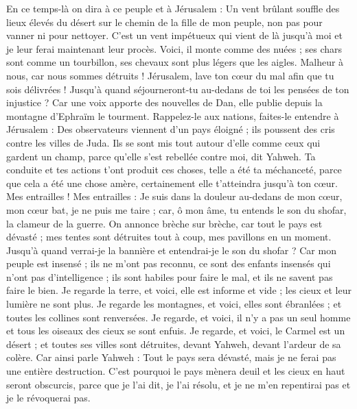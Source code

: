 \begin{multicols}{2}
En ce temps-là on dira à ce peuple et à Jérusalem : Un vent brûlant souffle des lieux élevés du désert sur le chemin de la fille de mon peuple, non pas pour vanner ni pour nettoyer.
C'est un vent impétueux qui vient de là jusqu'à moi et je leur ferai maintenant leur procès. 
Voici, il monte comme des nuées ; ses chars sont comme un tourbillon, ses chevaux sont plus légers que les aigles. Malheur à nous, car nous sommes détruits !
Jérusalem, lave ton cœur du mal afin que tu sois délivrées ! Jusqu'à quand séjourneront-tu au-dedans de toi les pensées de ton injustice ?
Car une voix apporte des nouvelles de Dan, elle publie depuis la montagne d'Ephraïm le tourment.
Rappelez-le aux nations, faites-le entendre à Jérusalem : Des observateurs viennent d'un pays éloigné ; ils poussent des cris contre les villes de Juda.
Ils se sont mis tout autour d'elle comme ceux qui gardent un champ, parce qu'elle s'est rebellée contre moi, dit Yahweh.
Ta conduite et tes actions t'ont produit ces choses, telle a été ta méchanceté, parce que cela a été une chose amère, certainement elle t'atteindra jusqu'à ton cœur.
Mes entrailles ! Mes entrailles : Je suis dans la douleur au-dedans de mon cœur, mon cœur bat, je ne puis me taire ; car, ô mon âme, tu entends le son du shofar, la clameur de la guerre.
On annonce brèche sur brèche, car tout le pays est dévasté ; mes tentes sont détruites tout à coup, mes pavillons en un moment.
Jusqu'à quand verrai-je la bannière et entendrai-je le son du shofar ?
Car mon peuple est insensé ; ils ne m'ont pas reconnu, ce sont des enfants insensés qui n'ont pas d'intelligence ; ils sont habiles pour faire le mal, et ils ne savent pas faire le bien.
Je regarde la terre, et voici, elle est informe et vide ; les cieux et leur lumière ne sont plus.
Je regarde les montagnes, et voici, elles sont ébranlées ; et toutes les collines sont renversées.
Je regarde, et voici, il n'y a pas un seul homme et tous les oiseaux des cieux se sont enfuis.
Je regarde, et voici, le Carmel est un désert ; et toutes ses villes sont détruites, devant Yahweh, devant l'ardeur de sa colère.
Car ainsi parle Yahweh : Tout le pays sera dévasté, mais je ne ferai pas une entière destruction.
C'est pourquoi le pays mènera deuil et les cieux en haut seront obscurcis, parce que je l'ai dit, je l'ai résolu, et je ne m'en repentirai pas et je le révoquerai pas.

\end{multicols}
